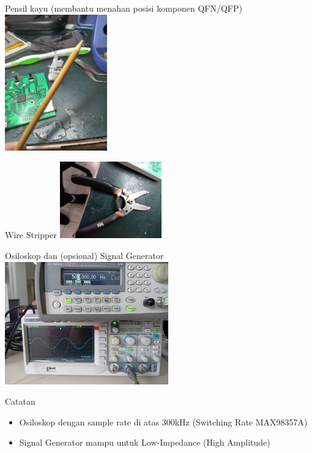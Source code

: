 \documentclass[table,dvipsnames]{beamer}
\begin{document}
	\begin{frame}
		\begin{exampleblock}{Pensil kayu (membantu menahan posisi komponen QFN/QFP)}
			\centering
			\includegraphics[width=125pt]{images/pensil_kayu}
		\end{exampleblock}

		\begin{exampleblock}{Wire Stripper}
			\centering
			\includegraphics[width=125pt]{images/tang_kabel}
		\end{exampleblock}
	\end{frame}

	\begin{frame}
		\begin{exampleblock}{Osiloskop dan (opsional) Signal Generator}
			\centering
			\includegraphics[width=200pt]{images/osi_siggen}
		\end{exampleblock}

		\begin{exampleblock}{Catatan}
			\begin{itemize}
				\item Osiloskop dengan sample rate di atas 300kHz (Switching Rate MAX98357A)
				\item Signal Generator mampu untuk Low-Impedance (High Amplitude)
			\end{itemize}
		\end{exampleblock}
	\end{frame}
\end{document}
